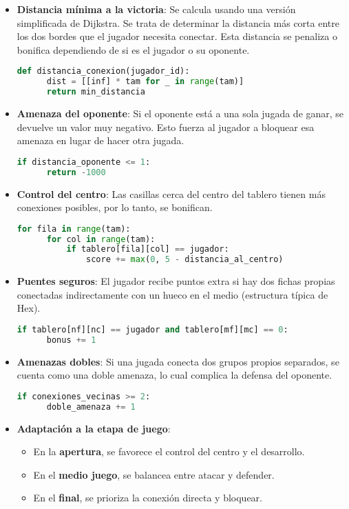 \documentclass[12pt]{article}
\begin{document}
\begin{itemize}
  \item \textbf{Distancia mínima a la victoria}: Se calcula usando una versión simplificada de Dijkstra. Se trata de determinar la distancia más corta entre los dos bordes que el jugador necesita conectar. Esta distancia se penaliza o bonifica dependiendo de si es el jugador o su oponente.
  \begin{lstlisting}[language=Python]
  def distancia_conexion(jugador_id):
      dist = [[inf] * tam for _ in range(tam)]
      return min_distancia
  \end{lstlisting}

  \item \textbf{Amenaza del oponente}: Si el oponente está a una sola jugada de ganar, se devuelve un valor muy negativo. Esto fuerza al jugador a bloquear esa amenaza en lugar de hacer otra jugada.
  \begin{lstlisting}[language=Python]
  if distancia_oponente <= 1:
      return -1000
  \end{lstlisting}

  \item \textbf{Control del centro}: Las casillas cerca del centro del tablero tienen más conexiones posibles, por lo tanto, se bonifican.
  \begin{lstlisting}[language=Python]
  for fila in range(tam):
      for col in range(tam):
          if tablero[fila][col] == jugador:
              score += max(0, 5 - distancia_al_centro)
  \end{lstlisting}

  \item \textbf{Puentes seguros}: El jugador recibe puntos extra si hay dos fichas propias conectadas indirectamente con un hueco en el medio (estructura típica de Hex).
  \begin{lstlisting}[language=Python]
  if tablero[nf][nc] == jugador and tablero[mf][mc] == 0:
      bonus += 1
  \end{lstlisting}

  \item \textbf{Amenazas dobles}: Si una jugada conecta dos grupos propios separados, se cuenta como una doble amenaza, lo cual complica la defensa del oponente.
  \begin{lstlisting}[language=Python]
  if conexiones_vecinas >= 2:
      doble_amenaza += 1
  \end{lstlisting}

  \item \textbf{Adaptación a la etapa de juego}:
  \begin{itemize}
    \item En la \textbf{apertura}, se favorece el control del centro y el desarrollo.
    \item En el \textbf{medio juego}, se balancea entre atacar y defender.
    \item En el \textbf{final}, se prioriza la conexión directa y bloquear.
  \end{itemize}
\end{itemize}
\end{document}

